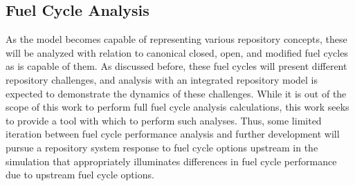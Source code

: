 \subsection{Fuel Cycle Analysis}

As the model becomes capable of representing various repository concepts, these will  
be analyzed with relation to canonical closed, open, and modified fuel cycles as  
\Cyclus is capable of them. As discussed before, these fuel cycles will present 
different repository challenges, and analysis with an integrated repository 
model is expected to demonstrate the dynamics of these challenges. While it is 
out of the scope of this work to perform full fuel cycle analysis calculations, 
this work seeks to provide a tool with which to perform such analyses. Thus, 
some limited iteration between fuel cycle performance analysis and further 
development will pursue a repository system response to fuel cycle options 
upstream in the simulation that appropriately illuminates differences in fuel 
cycle performance due to upstream fuel cycle options.



